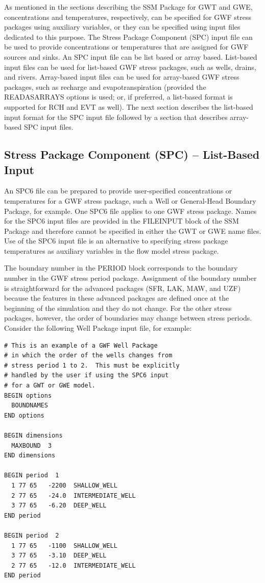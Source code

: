 As mentioned in the sections describing the SSM Package for GWT and GWE, concentrations and temperatures, respectively, can be specified for GWF stress packages using auxiliary variables, or they can be specified using input files dedicated to this purpose.  The Stress Package Component (SPC) input file can be used to provide concentrations or temperatures that are assigned for GWF sources and sinks.  An SPC input file can be list based or array based.  List-based input files can be used for list-based GWF stress packages, such as wells, drains, and rivers.  Array-based input files can be used for array-based GWF stress packages, such as recharge and evapotranspiration (provided the READASARRAYS options is used; or, if preferred, a list-based format is supported for RCH and EVT as well).  The next section describes the list-based input format for the SPC input file followed by a section that describes array-based SPC input files.

\subsection{Stress Package Component (SPC) -- List-Based Input}

An SPC6 file can be prepared to provide user-specified concentrations or temperatures for a GWF stress package, such a Well or General-Head Boundary Package, for example.  One SPC6 file applies to one GWF stress package.  Names for the SPC6 input files are provided in the FILEINPUT block of the SSM Package and therefore cannot be specified in either the GWT or GWE name files.  Use of the SPC6 input file is an alternative to specifying stress package temperatures as auxiliary variables in the flow model stress package.  

The boundary number in the PERIOD block corresponds to the boundary number in the GWF stress period package.  Assignment of the boundary number is straightforward for the advanced packages (SFR, LAK, MAW, and UZF) because the features in these advanced packages are defined once at the beginning of the simulation and they do not change.  For the other stress packages, however, the order of boundaries may change between stress periods.  Consider the following Well Package input file, for example:

\begin{verbatim}
# This is an example of a GWF Well Package
# in which the order of the wells changes from
# stress period 1 to 2.  This must be explicitly
# handled by the user if using the SPC6 input
# for a GWT or GWE model.
BEGIN options
  BOUNDNAMES
END options

BEGIN dimensions
  MAXBOUND  3
END dimensions

BEGIN period  1
  1 77 65   -2200  SHALLOW_WELL
  2 77 65   -24.0  INTERMEDIATE_WELL
  3 77 65   -6.20  DEEP_WELL
END period

BEGIN period  2
  1 77 65   -1100  SHALLOW_WELL
  3 77 65   -3.10  DEEP_WELL
  2 77 65   -12.0  INTERMEDIATE_WELL
END period
\end{verbatim}

